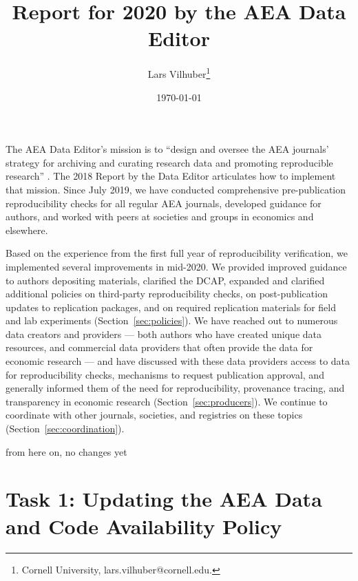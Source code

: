 \documentclass[PP]{AEA}
\begin{document}
\title{Report for 2020 by the AEA Data Editor }
\author{Lars Vilhuber\thanks{%
Cornell University, lars.vilhuber@cornell.edu. }
}
\date{\today}
\pubVolume{--}
\pubIssue{--}
\JEL{}




\maketitle

The \ac{AEA} Data Editor's  mission is to ``design  and  oversee  the  AEA  journals’  strategy for archiving and curating research data and promoting  reproducible  research'' \citep{10.1257/pandp.108.745}. The 2018 Report by the Data Editor \citep{10.1257/pandp.109.718} articulates how to implement that mission. Since July 2019, we have conducted comprehensive pre-publication reproducibility checks for all regular AEA journals, developed guidance for authors, and worked with peers at societies and groups in economics and elsewhere. 

Based on the experience from the first full year of reproducibility verification, we implemented several improvements in mid-2020. We provided improved guidance to authors depositing materials, clarified the \ac{DCAP}, expanded and clarified additional policies on third-party reproducibility checks, on post-publication updates to replication packages, and on required replication materials for field and lab experiments  (Section~\ref{sec:policies}). We have reached out to numerous data creators and providers --- both authors who have created unique data resources, and commercial data providers that often provide the data for economic research --- and have discussed with these data providers access to data for reproducibility checks, mechanisms to request publication approval, and generally informed them of the need for reproducibility, provenance tracing, and transparency in economic research (Section~\ref{sec:producers}). 
We continue to coordinate with other journals, societies, and registries on these topics (Section~\ref{sec:coordination}).

\begin{center}
	from here on, no changes yet
\end{center}

\section{Task 1: Updating the AEA Data and Code Availability Policy}
\label{sec:dcap}
\end{document}
